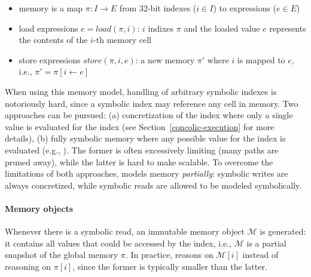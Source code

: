 \begin{itemize}
  \item memory is a map $\pi : I \to E$ from 32-bit indexes ($i \in I$) to expressions ($e \in E$)
  \item load expressions $e = load(\pi, i)$: $i$ indixes $\pi$ and the loaded value $e$ represents the contents of the $i$-th memory cell
  \item store expressions $store(\pi, i, e)$: a new memory $\pi'$ where $i$ is mapped to $e$, i.e., $\pi' = \pi[i \gets e]$
\end{itemize}
When using this memory model, handling of arbitrary symbolic indexes is notoriously hard, since a symbolic index may reference any cell in memory. Two approaches can be pursued: (a) concretization of the index where only a single value is evaluated for the index (see Section~\ref{concolic-execution} for more details), (b) fully symbolic memory where any possible value for the index is evaluated (e.g., \cite{BAP-CAV11}). The former is often excessively limiting (many paths are pruned away), while the latter is hard to make scalable. To overcome the limitations of both approaches, \cite{MAYHEM-SP12} models memory {\em partially}: symbolic writes are always concretized, while symbolic reads are allowed to be modeled symbolically.

\paragraph{Memory objects} Whenever there is a symbolic read, an immutable memory object $\mathcal{M}$ is generated:  it contains all values that could be accessed by the index, i.e., $\mathcal{M}$ is a partial snapshot of the global memory $\pi$. In practice, \cite{MAYHEM-SP12} reasons on $\mathcal{M}[i]$ instead of reasoning on $\pi[i]$, since the former is typically smaller than the latter.

